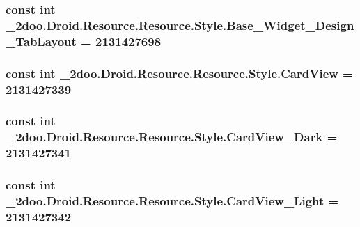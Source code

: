 \hypertarget{class__2doo_1_1_droid_1_1_resource_1_1_style_7ad103a9efeb7a1d6487826866a4c3a1}{
\subsubsection[{Base\_\-Widget\_\-Design\_\-TabLayout}]{\setlength{\rightskip}{0pt plus 5cm}const int \_\-2doo.Droid.Resource.Resource.Style.Base\_\-Widget\_\-Design\_\-TabLayout = 2131427698}}
\label{class__2doo_1_1_droid_1_1_resource_1_1_style_7ad103a9efeb7a1d6487826866a4c3a1}


\hypertarget{class__2doo_1_1_droid_1_1_resource_1_1_style_d8ddd2eb52803891ce6163aaac7d7cd4}{
\subsubsection[{CardView}]{\setlength{\rightskip}{0pt plus 5cm}const int \_\-2doo.Droid.Resource.Resource.Style.CardView = 2131427339}}
\label{class__2doo_1_1_droid_1_1_resource_1_1_style_d8ddd2eb52803891ce6163aaac7d7cd4}


\hypertarget{class__2doo_1_1_droid_1_1_resource_1_1_style_6378008010174970fbe1b489687a9181}{
\subsubsection[{CardView\_\-Dark}]{\setlength{\rightskip}{0pt plus 5cm}const int \_\-2doo.Droid.Resource.Resource.Style.CardView\_\-Dark = 2131427341}}
\label{class__2doo_1_1_droid_1_1_resource_1_1_style_6378008010174970fbe1b489687a9181}


\hypertarget{class__2doo_1_1_droid_1_1_resource_1_1_style_01532052b5b8563a55f822d24905349c}{
\subsubsection[{CardView\_\-Light}]{\setlength{\rightskip}{0pt plus 5cm}const int \_\-2doo.Droid.Resource.Resource.Style.CardView\_\-Light = 2131427342}}
\label{class__2doo_1_1_droid_1_1_resource_1_1_style_01532052b5b8563a55f822d24905349c}


